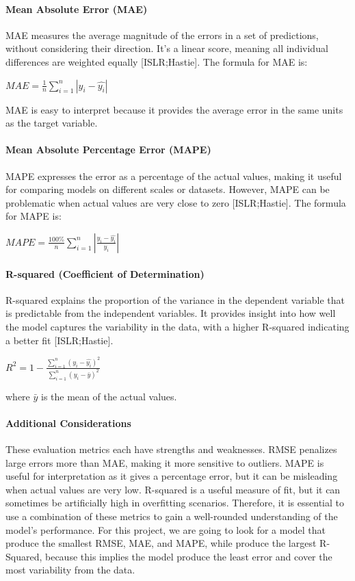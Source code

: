 \documentclass[11pt,a4paper,]{article}
\begin{document}
\paragraph{Mean Absolute Error (MAE)}\label{mean-absolute-error-mae}

MAE measures the average magnitude of the errors in a set of predictions, without considering their direction. It's a linear score, meaning all individual differences are weighted equally {[}ISLR;Hastie{]}. The formula for MAE is:

\(MAE = \frac{1}{n} {\sum^n_{i=1}|y_i-\hat{y_i}|}\)

MAE is easy to interpret because it provides the average error in the same units as the target variable.

\paragraph{Mean Absolute Percentage Error (MAPE)}\label{mean-absolute-percentage-error-mape}

MAPE expresses the error as a percentage of the actual values, making it useful for comparing models on different scales or datasets. However, MAPE can be problematic when actual values are very close to zero {[}ISLR;Hastie{]}. The formula for MAPE is:

\(MAPE = \frac{100\%}{n} {\sum^n_{i=1}|\frac{y_i-\hat{y_i}}{y_i}|}\)

\paragraph{R-squared (Coefficient of Determination)}\label{r-squared-coefficient-of-determination}

R-squared explains the proportion of the variance in the dependent variable that is predictable from the independent variables. It provides insight into how well the model captures the variability in the data, with a higher R-squared indicating a better fit {[}ISLR;Hastie{]}.

\(R^2 = 1-\frac{\sum^n_{i=1}(y_i-\hat{y_i})^2}{\sum^n_{i=1}(y_i-\bar{y})^2}\)

where \(\bar{y}\) is the mean of the actual values.

\paragraph{Additional Considerations}\label{additional-considerations}

These evaluation metrics each have strengths and weaknesses. RMSE penalizes large errors more than MAE, making it more sensitive to outliers. MAPE is useful for interpretation as it gives a percentage error, but it can be misleading when actual values are very low. R-squared is a useful measure of fit, but it can sometimes be artificially high in overfitting scenarios. Therefore, it is essential to use a combination of these metrics to gain a well-rounded understanding of the model's performance. For this project, we are going to look for a model that produce the smallest RMSE, MAE, and MAPE, while produce the largest R-Squared, because this implies the model produce the least error and cover the most variability from the data.
\end{document}
